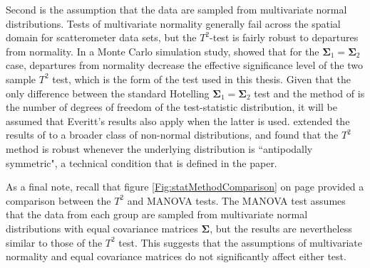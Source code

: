 \documentclass[12pt]{book}
\begin{document}
Second is the assumption that the data are sampled from multivariate normal distributions. Tests of multivariate normality generally fail across the spatial domain for scatterometer data sets, but the $T^2$-test is fairly robust to departures from normality. In a Monte Carlo simulation study, \citet[]{everitt79} showed that for the $\boldsymbol{\Sigma}_1=\boldsymbol{\Sigma}_2$ case, departures from normality decrease the effective significance level of the two sample $T^2$ test, which is the form of the test used in this thesis. Given that the only difference between the standard Hotelling $\boldsymbol{\Sigma}_1=\boldsymbol{\Sigma}_2$ test and the method of \citet[]{nel86} is the number of degrees of freedom of the test-statistic distribution, it will be assumed that Everitt's results also apply when the latter is used. \citet[]{nachtsheim88} extended the results of \citet[]{everitt79} to a broader class of non-normal distributions, and found that the $T^2$ method is robust whenever the underlying distribution is ``antipodally symmetric", a technical condition that is defined in the paper.

As a final note, recall that figure \ref{Fig:statMethodComparison} on page \pageref{Fig:statMethodComparison} provided a comparison between the $T^2$ and MANOVA tests. The MANOVA test assumes that the data from each group are sampled from multivariate normal distributions with equal covariance matrices $\boldsymbol{\Sigma}$, but the results are nevertheless similar to those of the \citet{nel86} $T^2$ test. This suggests that the assumptions of multivariate normality and equal covariance matrices do not significantly affect either test. 
\end{document}
